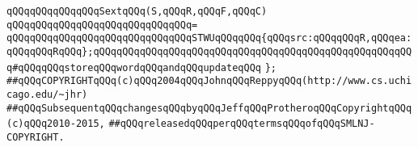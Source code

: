 \verb|qQQqqQQqqQQqqQQqSextqQQq(S,qQQqR,qQQqF,qQQqC)|\newline
\verb|qQQqqQQqqQQqqQQqqQQqqQQqqQQqqQQq=|\newline
\verb|qQQqqQQqqQQqqQQqqQQqqQQqqQQqqQQqSTWUqQQqqQQq{qQQqsrc:qQQqqQQqR,qQQqea:qQQqqQQqRqQQq};qQQqqQQqqQQqqQQqqQQqqQQqqQQqqQQqqQQqqQQqqQQqqQQqqQQqqQQq#qQQqqQQqstoreqQQqwordqQQqandqQQqupdateqQQq|\newline
\verb|};|\newline
\newline
\newline
\verb|##qQQqCOPYRIGHTqQQq(c)qQQq2004qQQqJohnqQQqReppyqQQq(http://www.cs.uchicago.edu/~jhr)|\newline
\verb|##qQQqSubsequentqQQqchangesqQQqbyqQQqJeffqQQqProtheroqQQqCopyrightqQQq(c)qQQq2010-2015,|\newline
\verb|##qQQqreleasedqQQqperqQQqtermsqQQqofqQQqSMLNJ-COPYRIGHT.|\newline

